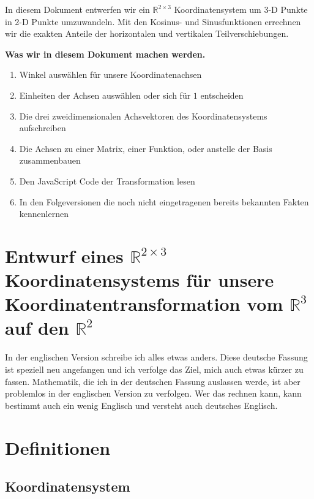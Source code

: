 \documentclass[a4paper]{article}
\begin{document}
In diesem Dokument entwerfen wir ein $\mathbb{R}^{2\times{3}}$ Koordinatensystem um 3-D Punkte in 2-D Punkte umzuwandeln.
Mit den Kosinus- und Sinusfunktionen errechnen wir die exakten Anteile der horizontalen und vertikalen Teilverschiebungen.

\textbf{Was wir in diesem Dokument machen werden.}

\begin{enumerate}
\item Winkel ausw\"ahlen f\"ur unsere Koordinatenachsen 
\item Einheiten der Achsen ausw\"ahlen oder sich f\"ur $1$ entscheiden
\item Die drei zweidimensionalen Achsvektoren des Koordinatensystems aufschreiben
\item Die Achsen zu einer Matrix, einer Funktion, oder anstelle der Basis zusammenbauen
\item Den JavaScript Code der Transformation lesen
\item In den Folgeversionen die noch nicht eingetragenen bereits bekannten Fakten kennenlernen

\end{enumerate}


\section{Entwurf eines $\mathbb{R}^{2\times{3}}$ Koordinatensystems f\"ur unsere Koordinatentransformation vom $\mathbb{R}^{3}$ auf den $\mathbb{R}^{2}$}

In der englischen Version schreibe ich alles etwas anders. Diese deutsche Fassung ist speziell neu angefangen und ich verfolge das
Ziel, mich auch etwas k\"urzer zu fassen. Mathematik, die ich in der deutschen Fassung auslassen werde, ist aber problemlos in der
englischen Version zu verfolgen. Wer das rechnen kann, kann bestimmt auch ein wenig Englisch und versteht auch deutsches Englisch.

\section{Definitionen}

\subsection{Koordinatensystem}
\end{document}
